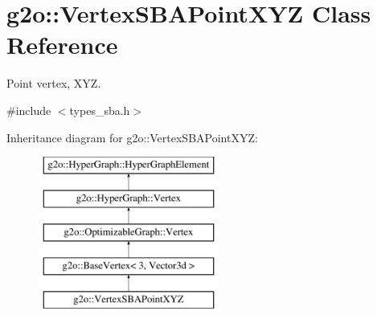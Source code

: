 \hypertarget{classg2o_1_1_vertex_s_b_a_point_x_y_z}{}\section{g2o\+:\+:Vertex\+S\+B\+A\+Point\+X\+YZ Class Reference}
\label{classg2o_1_1_vertex_s_b_a_point_x_y_z}


Point vertex, X\+YZ.  




{\ttfamily \#include $<$types\+\_\+sba.\+h$>$}

Inheritance diagram for g2o\+:\+:Vertex\+S\+B\+A\+Point\+X\+YZ\+:\begin{figure}[H]
\begin{center}
\leavevmode
\includegraphics[height=5.000000cm]{classg2o_1_1_vertex_s_b_a_point_x_y_z}
\end{center}
\end{figure}
